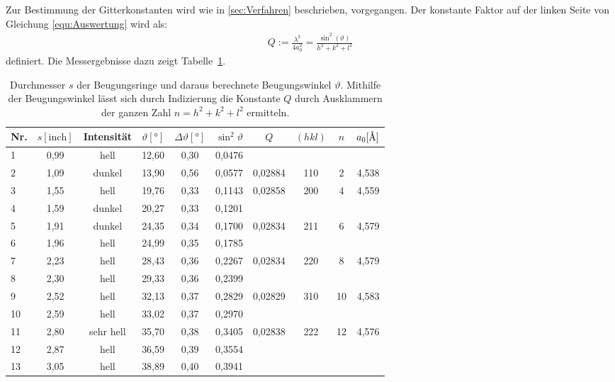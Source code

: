 \documentclass[a4paper,twoside,final]{article}
\begin{document}
Zur Bestimmung der Gitterkonstanten wird wie in \ref{sec:Verfahren} beschrieben, vorgegangen. Der konstante Faktor auf der linken Seite von Gleichung \ref{equ:Auswertung}
wird als:
\begin{align}
  Q :=\frac{\lambda^2}{4 a_0^2} = \frac{\sin^2(\vartheta)}{h^2 + k^2+l^2}\label{eqn:Q_Parameter}
\end{align} definiert. Die Messergebnisse dazu zeigt Tabelle~\ref{tab:Q_Paramter}.
\begin{table}[ht]
	\centering
	\caption{Durchmesser $s$ der Beugungsringe und daraus berechnete Beugungswinkel $\vartheta$. Mithilfe der Beugungswinkel lässt sich durch Indizierung die Konstante $Q$ durch Ausklammern der ganzen Zahl $n = h^2 +k^2 +l^2$ ermitteln.}
	\label{tab:Q_Paramter}
	\begin{tabular}{l c c c c c | c c c c}
		\toprule
      Nr. & $s [\text{inch}]$ & Intensität & $\vartheta [\si{\degree}]$ & $\Delta \vartheta [\si{\degree}]$ & $\sin^2 \vartheta $ & $Q$ & $(hkl)$ & $n$ & $a_0 [\si{\textup{\AA}}]$\\
    \midrule
1  & 0,99 & hell      & 12,60 & 0,30 & 0,0476 &         &     &    &       \\
2  & 1,09 & dunkel    & 13,90 & 0,56 & 0,0577 & 0,02884 & 110 & 2  & 4,538 \\
3  & 1,55 & hell      & 19,76 & 0,33 & 0,1143 & 0,02858 & 200 & 4  & 4,559 \\
4  & 1,59 & dunkel    & 20,27 & 0,33 & 0,1201 &         &     &    &       \\
5  & 1,91 & dunkel    & 24,35 & 0,34 & 0,1700 & 0,02834 & 211 & 6  & 4,579 \\
6  & 1,96 & hell      & 24,99 & 0,35 & 0,1785 &         &     &    &       \\
7  & 2,23 & hell      & 28,43 & 0,36 & 0,2267 & 0,02834 & 220 & 8  & 4,579 \\
8  & 2,30 & hell      & 29,33 & 0,36 & 0,2399 &         &     &    &       \\
9  & 2,52 & hell      & 32,13 & 0,37 & 0,2829 & 0,02829 & 310 & 10 & 4,583 \\
10 & 2,59 & hell      & 33,02 & 0,37 & 0,2970 &         &     &    &       \\
11 & 2,80 & sehr hell & 35,70 & 0,38 & 0,3405 & 0,02838 & 222 & 12 & 4,576 \\
12 & 2,87 & hell      & 36,59 & 0,39 & 0,3554 &         &     &    &       \\
13 & 3,05 & hell      & 38,89 & 0,40 & 0,3941 &         &     &    &       \\

\end{tabular}
\end{table}
\end{document}
